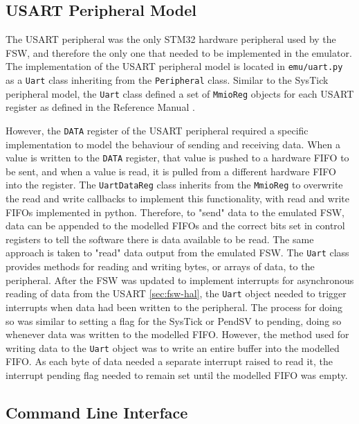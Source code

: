 \documentclass[../report.tex]{subfiles}
\begin{document}
\subsection{USART Peripheral Model}

The USART peripheral was the only STM32 hardware peripheral used by the FSW,
and therefore the only one that needed to be implemented in the emulator. The
implementation of the USART peripheral model is located in
\lstinline{emu/uart.py} as a \lstinline|Uart| class inheriting from the
\lstinline|Peripheral| class. Similar to the SysTick peripheral model, the
\lstinline|Uart| class defined a set of \lstinline|MmioReg| objects for each
USART register as defined in the Reference Manual \citep{stm32f4_manual}.

However, the \lstinline|DATA| register of the USART peripheral required a
specific implementation to model the behaviour of sending and receiving data.
When a value is written to the \lstinline|DATA| register, that value is pushed
to a hardware FIFO to be sent, and when a value is read, it is pulled from a
different hardware FIFO into the register. The \lstinline|UartDataReg| class
inherits from the \lstinline|MmioReg| to overwrite the read and write callbacks
to implement this functionality, with read and write FIFOs implemented in
python. Therefore, to "send" data to the emulated FSW, data can be appended to
the modelled FIFOs and the correct bits set in control registers to tell the
software there is data available to be read. The same approach is taken to
"read" data output from the emulated FSW. The \lstinline|Uart| class provides
methods for reading and writing bytes, or arrays of data, to the peripheral.
After the FSW was updated to implement interrupts for asynchronous reading of
data from the USART \autoref{sec:fsw-hal}, the \lstinline|Uart| object needed
to trigger interrupts when data had been written to the peripheral. The process
for doing so was similar to setting a flag for the SysTick or PendSV to
pending, doing so whenever data was written to the modelled FIFO. However, the
method used for writing data to the \lstinline|Uart| object was to write an
entire buffer into the modelled FIFO. As each byte of data needed a separate
interrupt raised to read it, the interrupt pending flag needed to remain set
until the modelled FIFO was empty.

\subsection{Command Line Interface}
\end{document}
